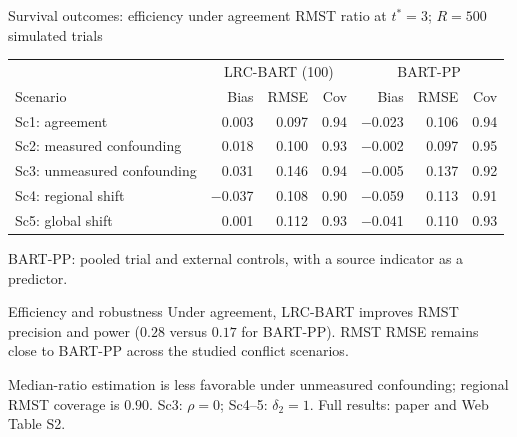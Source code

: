 \documentclass[11pt,aspectratio=169]{beamer}
\begin{document}
\begin{frame}{Survival outcomes: efficiency under agreement}
  \centering
  \footnotesize
  RMST ratio at $t^\ast=3$; $R=500$ simulated trials
  \vspace{0.1em}

  \setlength{\tabcolsep}{6pt}
  \renewcommand{\arraystretch}{0.9}
  \begin{tabular}{lrrr|rrr}
    \toprule
    & \multicolumn{3}{c|}{LRC-BART (100)} & \multicolumn{3}{c}{BART-PP} \\
    Scenario & Bias & RMSE & Cov & Bias & RMSE & Cov \\
    \midrule
    Sc1: agreement & 0.003 & 0.097 & 0.94 & $-$0.023 & 0.106 & 0.94 \\
    Sc2: measured confounding & 0.018 & 0.100 & 0.93 & $-$0.002 & 0.097 & 0.95 \\
    Sc3: unmeasured confounding & 0.031 & 0.146 & 0.94 & $-$0.005 & 0.137 & 0.92 \\
    Sc4: regional shift & $-$0.037 & 0.108 & 0.90 & $-$0.059 & 0.113 & 0.91 \\
    Sc5: global shift & 0.001 & 0.112 & 0.93 & $-$0.041 & 0.110 & 0.93 \\
    \bottomrule
  \end{tabular}
  \vspace{0.2em}

  {\scriptsize BART-PP: pooled trial and external controls, with a source indicator as a predictor.}
  \begin{block}{Efficiency and robustness}
    Under agreement, LRC-BART improves RMST precision and power ($0.28$ versus $0.17$ for BART-PP). RMST RMSE remains close to BART-PP across the studied conflict scenarios.
  \end{block}
  {\scriptsize Median-ratio estimation is less favorable under unmeasured confounding; regional RMST coverage is $0.90$. Sc3: $\rho=0$; Sc4--5: $\delta_2=1$. Full results: paper and Web Table S2.}
\end{frame}
\end{document}
